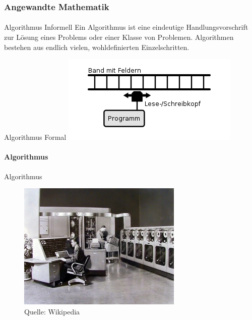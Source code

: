 \documentclass{beamer}
\begin{document}
\begin{frame}
    \frametitle{Angewandte Mathematik}
\framesubtitle{}
    \begin{block}{Algorithmus Informell}
Ein Algorithmus ist eine eindeutige Handlungsvorschrift zur Lösung eines Problems oder einer Klasse von Problemen. Algorithmen bestehen aus endlich vielen, wohldefinierten Einzelschritten.
\end{block}
    \begin{block}{Algorithmus Formal}
\includegraphics[scale=0.8]{images/Turingmaschine}
\end{block}
 \end{frame}

\begin{frame}
\framesubtitle{Algorithmus}
    \begin{block}{Algorithmus}
\begin{figure}[H]
      \centering
    \includegraphics[width=0.7\textwidth]{images/computer}
      \caption{Quelle: Wikipedia}
\end{figure}
\end{block}

 \end{frame}
\end{document}
